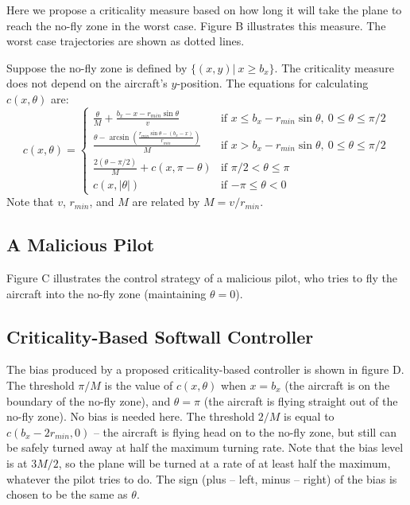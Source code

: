 \documentclass[11pt]{article}
\begin{document}
Here we propose a criticality measure based on how long it will take the plane
to reach the no-fly zone in the worst case. Figure B illustrates this measure.
The worst case trajectories are shown as dotted lines.

Suppose the no-fly zone is defined by $\{(x,y)|\ x \geq b_{x}\}$. The 
criticality measure does not depend on the aircraft's $y$-position. The
equations for calculating $c(x, \theta)$ are:
\[
c(x, \theta) = \left\{ \begin{array}{ll}
\frac{\theta}{M} + \frac{b_{x} - x - r_{min}\sin{\theta}}{v} & \mbox{if $x \leq b_{x} - r_{min}\sin{\theta},\ 0 \leq \theta \leq \pi/2$} \\
\frac{\theta - \arcsin{\left( \frac{r_{min}\sin{\theta}-(b_{x} - x)}{r_{min}}\right) }}{M} & \mbox{if $x > b_{x} -r_{min}\sin{\theta},\ 0 \leq \theta \leq \pi/2$} \\
\frac{2(\theta - \pi/2)}{M} + c(x, \pi - \theta) & \mbox{if $\pi/2 < \theta \leq \pi$} \\
c(x, |\theta|) & \mbox{if $-\pi \leq \theta < 0$}
\end{array}
\right.
\]
Note that $v$, $r_{min}$, and $M$ are related by $M = v/r_{min}$.

\subsection{A Malicious Pilot}

Figure C illustrates the control strategy of a malicious pilot, who tries to
fly the aircraft into the no-fly zone (maintaining $\theta = 0$).

\subsection{Criticality-Based Softwall Controller}

The bias produced by a proposed criticality-based controller is shown in figure
D. The threshold $\pi/M$ is the value of $c(x, \theta)$ when $x = b_{x}$ (the 
aircraft is on the boundary of the no-fly zone), and $\theta = \pi$ (the 
aircraft is flying straight out of the no-fly zone). No bias is needed here.
The threshold $2/M$ is equal to $c(b_{x}-2r_{min}, 0)$ -- the aircraft is flying
head on to the no-fly zone, but still can be safely turned away at half the 
maximum turning rate. Note that the bias level is at $3M/2$, so the plane will
be turned at a rate of at least half the maximum, whatever the pilot tries to
do. The sign (plus -- left, minus -- right) of the bias is chosen to be the
same as $\theta$.
\end{document}
